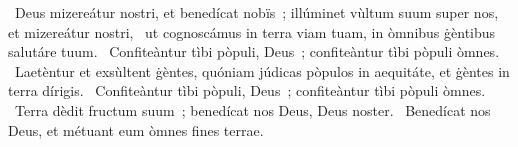 ~Deus mizereátur nostri, et benedícat nobïs~; illúminet vùltum suum super nos, et mizereátur nostri, 
~ut cognoscámus in terra viam tuam, in òmnibus ġèntibus salutáre tuum. 
~Confiteàntur tìbi pòpuli, Deus~; confiteàntur tìbi pòpuli òmnes. 
~Laetèntur et exsùltent ġèntes, quóniam júdicas pòpulos in aequitáte, et ġèntes in terra dírigis. 
~Confiteàntur tìbi pòpuli, Deus~; confiteàntur tìbi pòpuli òmnes. 
~Terra dèdit fructum suum~; benedícat nos Deus, Deus noster. 
~Benedícat nos Deus, et métuant eum òmnes fines terrae. 
